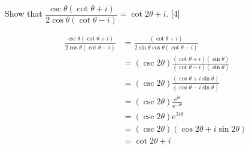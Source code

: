 \documentclass[12pt, a4 paper]{article}
\begin{document}
\begin{outline}[enumerate]
	\2 Show that $\dfrac{\csc{\theta}(\cot{\theta}+i)}{2\cos{\theta}(\cot{\theta}-i)} = \cot{2\theta}+i$. \hfill[4] %
	\begin{answer}
		\begin{align*}
			\frac{\csc{\theta}(\cot{\theta}+i)}{2\cos{\theta}(\cot{\theta}-i)} & = \frac{(\cot{\theta}+i)}{2\sin\theta\cos{\theta}(\cot{\theta}-i)}                \\
			                                                                   & = (\csc2\theta) \frac{(\cot{\theta}+i)(\sin\theta)}{(\cot{\theta}-i)(\sin\theta)} \\
			                                                                   & = (\csc2\theta) \frac{(\cos{\theta}+i\sin{\theta})}{(\cos{\theta}-i\sin{\theta})} \\
			                                                                   & = (\csc2\theta) \frac{\mathrm{e}^{i\theta}}{\mathrm{e}^{-i\theta}}                \\
			                                                                   & = (\csc2\theta) {\mathrm{e}^{2i\theta}}                                           \\
			                                                                   & = (\csc2\theta) (\cos{2\theta}+i\sin{2\theta})                                    \\
			                                                                   & = \cot{2\theta}+i
		\end{align*}
	\end{answer}


\end{outline}
\end{document}
